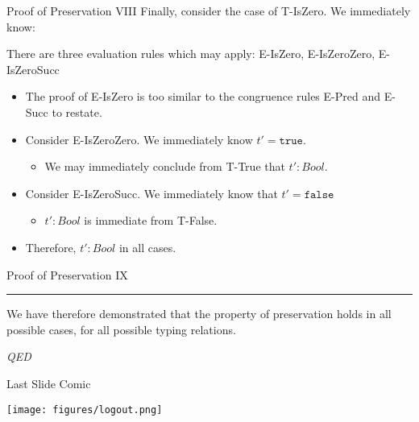 \documentclass[11pt]{beamer}
\begin{document}
\begin{frame}[fragile=singleslide]{Proof of Preservation VIII}
Finally, consider the case of T-IsZero.  We immediately know:
There are three evaluation rules which may apply: E-IsZero, E-IsZeroZero, E-IsZeroSucc
\begin{itemize}
\item The proof of E-IsZero is too similar to the congruence rules E-Pred and E-Succ to restate.  
\item Consider E-IsZeroZero. We immediately know $t' = \texttt{true}$.
\begin{itemize}
 \item We may immediately conclude from T-True that $t' : Bool$. 
 \end{itemize} 
\item Consider E-IsZeroSucc.  We immediately know that $t' = \texttt{false}$
\begin{itemize}
\item $t' : Bool$ is immediate from T-False.
\end{itemize}
\item Therefore, $t' : Bool$ in all cases.  
\end{itemize}
\end{frame}

\begin{frame}[fragile=singleslide]{Proof of Preservation IX}
\hrule 
\vspace{0.5em}
We have therefore demonstrated that the property of preservation holds in all possible cases, for all possible typing relations.  
\begin{center}
\emph{QED}
\end{center}

\end{frame}


\begin{frame}[fragile=singleslide]{Last Slide Comic}
\begin{center}
\texttt{[image: figures/logout.png]}
\end{center}
\end{frame}
\end{document}
